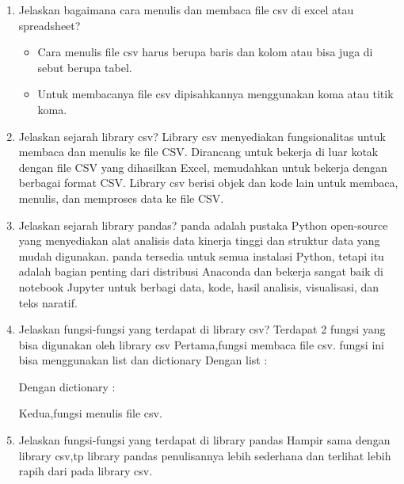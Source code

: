 \begin{enumerate}
    \item Jelaskan bagaimana cara menulis dan membaca file csv di excel atau spreadsheet?
	\begin{itemize}
        \item Cara menulis file csv harus berupa baris dan kolom atau bisa juga di sebut berupa tabel.
        \item Untuk membacanya file csv dipisahkannya menggunakan koma atau titik koma.
    \end{itemize}
    
    \item Jelaskan sejarah library csv?
	Library csv menyediakan fungsionalitas untuk membaca dan menulis ke file CSV. Dirancang untuk bekerja di luar kotak dengan file CSV yang dihasilkan Excel, memudahkan untuk bekerja dengan berbagai format CSV. Library csv berisi objek dan kode lain untuk membaca, menulis, dan memproses data ke file CSV.
    
    \item Jelaskan sejarah library pandas?
	panda adalah pustaka Python open-source yang menyediakan alat analisis data kinerja tinggi dan struktur data yang mudah digunakan. panda tersedia untuk semua instalasi Python, tetapi itu adalah bagian penting dari distribusi Anaconda dan bekerja sangat baik di notebook Jupyter untuk berbagi data, kode, hasil analisis, visualisasi, dan teks naratif.

    \item Jelaskan fungsi-fungsi yang terdapat di library csv?
	Terdapat 2 fungsi yang bisa digunakan oleh library csv
    Pertama,fungsi membaca file csv.
    fungsi ini bisa menggunakan list dan dictionary
    Dengan list :
    
    Dengan dictionary :
    
    Kedua,fungsi menulis file csv.
    
    
    \item Jelaskan fungsi-fungsi yang terdapat di library pandas
	Hampir sama dengan library csv,tp library pandas penulisannya lebih sederhana dan terlihat lebih rapih dari pada library csv.
    
\end{enumerate}

